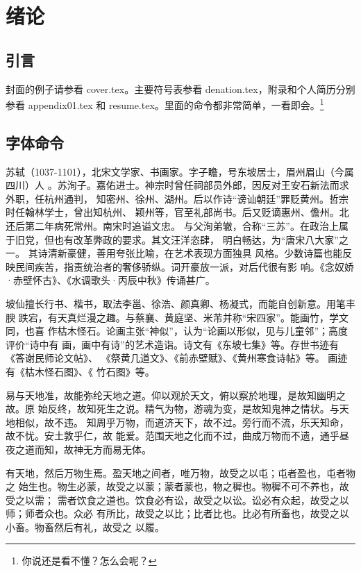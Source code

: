 ﻿

\chapter{绪论}
\label{cha:intro}

\section{引言}
封面的例子请参看 cover.tex。主要符号表参看 denation.tex，附录和个人简历分别参看 appendix01.tex
和 resume.tex。里面的命令都非常简单，一看即会。\footnote{你说还是看不懂？怎么会呢？}

\section{字体命令}
\label{sec:first}

苏轼（1037-1101），北宋文学家、书画家。字子瞻，号东坡居士，眉州眉山（今属四川）人
。苏洵子。嘉佑进士。神宗时曾任祠部员外郎，因反对王安石新法而求外职，任杭州通判，
知密州、徐州、湖州。后以作诗“谤讪朝廷”罪贬黄州。哲宗时任翰林学士，曾出知杭州、
颖州等，官至礼部尚书。后又贬谪惠州、儋州。北还后第二年病死常州。南宋时追谥文忠。
与父洵弟辙，合称“三苏”。在政治上属于旧党，但也有改革弊政的要求。其文汪洋恣肆，
明白畅达，为“唐宋八大家”之一。  其诗清新豪健，善用夸张比喻，在艺术表现方面独具
风格。少数诗篇也能反映民间疾苦，指责统治者的奢侈骄纵。词开豪放一派，对后代很有影
响。《念奴娇·赤壁怀古》、《水调歌头·丙辰中秋》传诵甚广。

{\kai 坡仙擅长行书、楷书，取法李邕、徐浩、颜真卿、杨凝式，而能自创新意。用笔丰腴
  跌宕，有天真烂漫之趣。与蔡襄、黄庭坚、米芾并称“宋四家”。能画竹，学文同，也喜
  作枯木怪石。论画主张“神似”，认为“论画以形似，见与儿童邻”；高度评价“诗中有
  画，画中有诗”的艺术造诣。诗文有《东坡七集》等。存世书迹有《答谢民师论文帖》、
  《祭黄几道文》、《前赤壁赋》、《黄州寒食诗帖》等。  画迹有《枯木怪石图》、《
  竹石图》等。}

{\fs 易与天地准，故能弥纶天地之道。仰以观於天文，俯以察於地理，是故知幽明之故。原
  始反终，故知死生之说。精气为物，游魂为变，是故知鬼神之情状。与天地相似，故不违。
  知周乎万物，而道济天下，故不过。旁行而不流，乐天知命，故不忧。安土敦乎仁，故
  能爱。范围天地之化而不过，曲成万物而不遗，通乎昼夜之道而知，故神无方而易无体。}

{\you 有天地，然后万物生焉。盈天地之间者，唯万物，故受之以屯；屯者盈也，屯者物之
  始生也。物生必蒙，故受之以蒙；蒙者蒙也，物之穉也。物穉不可不养也，故受之以需；
  需者饮食之道也。饮食必有讼，故受之以讼。讼必有众起，故受之以师；师者众也。众必
  有所比，故受之以比；比者比也。比必有所畜也，故受之以小畜。物畜然后有礼，故受之
  以履。}

